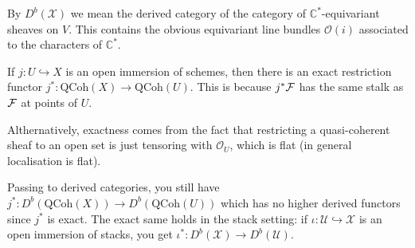\documentclass[12pt]{article}
\begin{document}
By $D^b(\mathcal{X})$ we mean the derived category of the category of $\mathbb{C}^*$-equivariant sheaves on $V$. This contains the obvious equivariant line bundles $\mathcal{O}(i)$ associated to the characters of $\mathbb{C}^*$.

\begin{remark}
If $j: U \hookrightarrow X$ is an open immersion of schemes, then there is an exact restriction functor $j^*: \mathrm{QCoh}(X) \to \mathrm{QCoh}(U)$. This is because $j^*{\mathcal{F}}$ has the same stalk as ${\mathcal{F}}$ at points of $U$.

Althernatively, exactness comes from the fact that restricting a quasi-coherent sheaf to an open set is just tensoring with $\mathcal{O}_U$, which is flat (in general localisation is flat).

Passing to derived categories, you still have $j^*: D^b(\mathrm{QCoh}(X)) \to D^b(\mathrm{QCoh}(U))$ which has no higher derived functors since $j^*$ is exact. The exact same holds in the stack setting: if $\iota: \mathcal{U} \hookrightarrow \mathcal{X}$ is an open immersion of stacks, you get $\iota^*: D^b(\mathcal{X}) \to D^b(\mathcal{U})$.
\end{remark}
\end{document}
